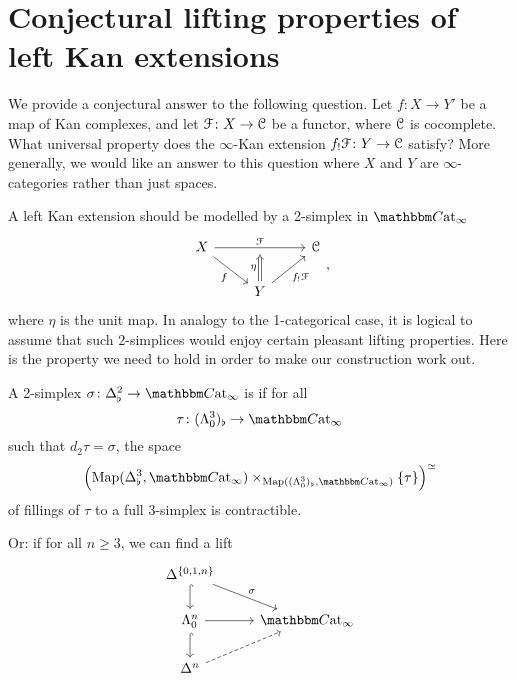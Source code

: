\documentclass[main.tex]{subfiles}
\begin{document}
\section{Conjectural lifting properties of left Kan extensions}
\label{sec:con_extensions}

We provide a conjectural answer to the following question. Let $f\colon X \to Y'$ be a map of Kan complexes, and let $\mathcal{F}\colon X \to \mathcal{C}$ be a functor, where $\mathcal{C}$ is cocomplete. What universal property does the $\infty$-Kan extension $f_{!}\mathcal{F}\colon Y \to \mathcal{C}$ satisfy? More generally, we would like an answer to this question where $X$ and $Y$ are $\infty$-categories rather than just spaces.

A left Kan extension should be modelled by a 2-simplex in $\ICCat$
\begin{equation*}
  \label{eq:left_kan_ext}
  \begin{tikzcd}
    X
    \arrow[rr, "\mathcal{F}", ""{below, name=M}]
    \arrow[dr, swap, "f"]
    && \category{C}
    \\
    & Y
    \arrow[ur, swap, "f_{!}\mathcal{F}"]
    \arrow[to=M, Rightarrow, "\eta"]
  \end{tikzcd},
\end{equation*}
where $\eta$ is the unit map. In analogy to the 1-categorical case, it is logical to assume that such $2$-simplices would enjoy certain pleasant lifting properties. Here is the property we need to hold in order to make our construction work out.

\begin{definition}
  \label{def:con_extension}
  A 2-simplex $\sigma\colon \Delta^{2}_{\flat} \to \ICCat$ is  if for all
  \begin{equation*}
    \tau\colon ( \Lambda^{3}_{0} )_{\flat} \to \ICCat
  \end{equation*}
  such that $d_{2}\tau = \sigma$, the space
  \begin{equation*}
    \left( \Map(\Delta^{3}_{\flat}, \ICCat) \times_{\Map((\Lambda^{3}_{0})_{\flat}, \ICCat)} \{\tau\} \right)^{\simeq}
  \end{equation*}
  of fillings of $\tau$ to a full 3-simplex is contractible.

  Or: if for all $n \geq 3$, we can find a lift
  \begin{equation*}
    \begin{tikzcd}
      \Delta^{\{0,1,n\}}
      \arrow[d, hook]
      \arrow[dr, "\sigma"]
      \\
      \Lambda^{n}_{0}
      \arrow[r]
      \arrow[d, hook]
      & \ICCat
      \\
      \Delta^{n}
      \arrow[ur, dashed]
    \end{tikzcd}
  \end{equation*}
\end{definition}
\end{document}
